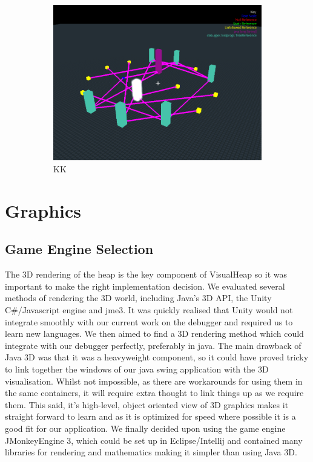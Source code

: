 \documentclass[11pt, a4paper]{report}
\begin{document}
\begin{figure}[h]
\begin{subfigure}[b]{0.4\textwidth}
                \centering
                \includegraphics[width=\textwidth]{images/final/kkcomparison.png}
                \caption{KK}
        \end{subfigure}
        \caption{}\label{}
\end{figure}

\section{Graphics}

\subsection{Game Engine Selection}

The 3D rendering of the heap is the key component of VisualHeap so it was important to make the right implementation decision. We evaluated several methods of rendering the 3D world, including Java’s 3D API, the Unity C{\#}/Javascript engine and jme3. It was quickly realised that Unity would not integrate smoothly with our current work on the debugger and required us to learn new languages. We then aimed to find a 3D rendering method which could integrate with our debugger perfectly, preferably in java. The main drawback of Java 3D was that it was a heavyweight component, so it could have proved tricky to link together the windows of our java swing application with the 3D visualisation. Whilst not impossible, as there are workarounds for using them in the same containers, it will require extra thought to link things up as we require them. This said, it’s high-level, object oriented view of 3D graphics makes it straight forward to learn and as it is optimized for speed where possible it is a good fit for our application. We finally decided upon using the game engine JMonkeyEngine 3, which could be set up in Eclipse/Intellij and contained many libraries for rendering and mathematics making it simpler than using Java 3D. 
\end{document}
